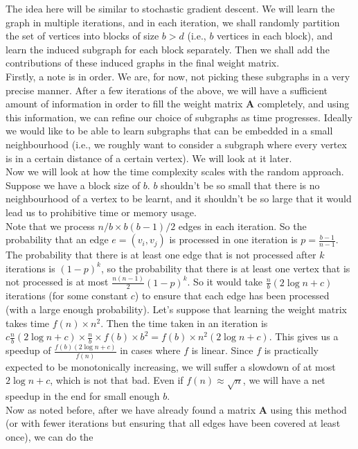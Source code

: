 \documentclass[a4paper]{article}
\newcommand{\nl}{\vspace{0.2cm}\\}
\newcommand{\mf}{\mathbf}
\begin{document}
The idea here will be similar to stochastic gradient descent. We will learn the graph in multiple iterations, and in each iteration, we shall randomly partition the set of vertices into blocks of size
$b > d$ (i.e., $b$ vertices in each block), and learn the induced subgraph for each block separately. Then we shall add the contributions of these induced graphs in the final weight matrix.\nl
Firstly, a note is in order. We are, for now, not picking these subgraphs in a very precise manner. After a few iterations of the above, we will have a sufficient amount of information in order to
fill the weight matrix $\mf{A}$ completely, and using this information, we can refine our choice of subgraphs as time progresses. Ideally we would like to be able to learn subgraphs that can be
embedded in a small neighbourhood (i.e., we roughly want to consider a subgraph where every vertex is in a certain distance of a certain vertex). We will look at it later.\nl
Now we will look at how the time complexity scales with the random approach.\nl
Suppose we have a block size of $b$. $b$ shouldn't be so small that there is no neighbourhood of a vertex to be learnt, and it shouldn't be so large that it would lead us to prohibitive time
or memory usage.\nl
Note that we process $n/b \times b(b - 1)/2$ edges in each iteration. So the probability that an edge $e = (v_i, v_j)$ is processed in one iteration is $p = \frac{b - 1}{n - 1}$. The probability
that there is at least one edge that is not processed after $k$ iterations is $(1 - p)^k$, so the probability that there is at least one vertex that is not processed is at most $\frac{n(n - 1)}{2}
(1 - p)^k$. So it would take
$\frac{n}{b} (2 \log n + c)$ iterations (for some constant $c$) to ensure that each edge has been processed (with a large enough probability). Let's suppose that learning the weight matrix takes time $f(n) \times n^2$. Then the time taken in an iteration
is $c \frac{n}{b} (2 \log n + c) \times \frac{n}{b} \times f(b) \times b^2 = f(b) \times n^2 (2 \log n + c)$. This gives us a speedup of $\frac{f(b) (2 \log n + c)}{f(n)}$ in cases where $f$ is linear. Since $f$ is
practically expected to be monotonically increasing, we will suffer a slowdown of at most $2 \log n + c$, which is not that bad. Even if $f(n) \approx \sqrt{n}$, we will have a net speedup in the
end for small enough $b$. \nl
Now as noted before, after we have already found a matrix $\mf{A}$ using this method (or with fewer iterations but ensuring that all edges have been covered at least once), we can do the
\end{document}
